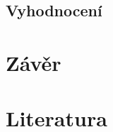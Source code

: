 \documentclass[12pt]{article}
\begin{document}
\subsection{Vyhodnocení}

\section{Závěr}

\section{Literatura}


\appendix
\end{document}
